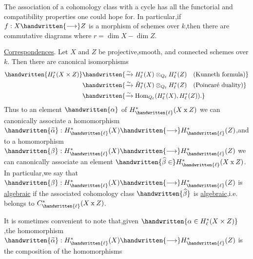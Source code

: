 The association of a cohomology class with a cycle has all the functorial and compatibility properties one could hope for. In particular,if $f:X\handwritten{\longrightarrow}Z$ is a morphism of schemes over $k$,then there are commutative diagrams
where $r=\dim X-\dim Z$.

\uline{Correspondences}. Let $X$ and $Z$ be projective,smooth, and connected schemes over $k$. Then there are canonical isomorphisms
\[
\begin{aligned}
\handwritten{H_\ell^*(X\times Z)}&\handwritten{\xrightarrow{\sim}H_\ell^*(X)\otimes_{Q_\ell}H_\ell^*(Z)\quad\text{(Kunneth formula)}}\\
&\handwritten{\xrightarrow{\sim}\check{H}_\ell^*(X)\otimes_{Q_\ell}H_\ell^*(Z)\quad\text{(Poincaré duality)}}\\
&\handwritten{\xrightarrow{\sim}\operatorname{Hom}_{Q_\ell}(H_\ell^*(X),H_\ell^*(Z)).}
\end{aligned}
\]
Thus to an element $\handwritten{\alpha}$ of $H_{\handwritten{\ell}}^*(X\mathbin{\mathrm{x}}Z)$ we can canonically associate a homomorphism $\handwritten{\widetilde{\alpha}}:H_{\handwritten{\ell}}^*(X)\handwritten{\longrightarrow}H_{\handwritten{\ell}}^*(Z)$,and to a homomorphism $\handwritten{\beta}:H_{\handwritten{\ell}}^*(X)\handwritten{\longrightarrow}H_{\handwritten{\ell}}^*(Z)$ we can canonically associate an element $\handwritten{\widehat{\beta}\in}H_{\handwritten{\ell}}^*(X\mathbin{\mathrm{x}}Z)$. In particular,we say that $\handwritten{\beta}:H_{\handwritten{\ell}}^*(X)\handwritten{\longrightarrow}H_{\handwritten{\ell}}^*(Z)$ is \uline{algebraic} if the associated cohomology class $\handwritten{\widehat{\beta}}$ is \uline{algebraic},i.e. belongs to $C_{\handwritten{\ell}}^*(X\mathbin{\mathrm{x}}Z)$.

It is sometimes convenient to note that,given $\handwritten{\alpha\in H_\ell^*(X\times Z)}$,the homomorphism $\handwritten{\widetilde{\alpha}}:H_{\handwritten{\ell}}^*(X)\handwritten{\longrightarrow}H_{\handwritten{\ell}}^*(Z)$ is the composition of the homomorphisms
